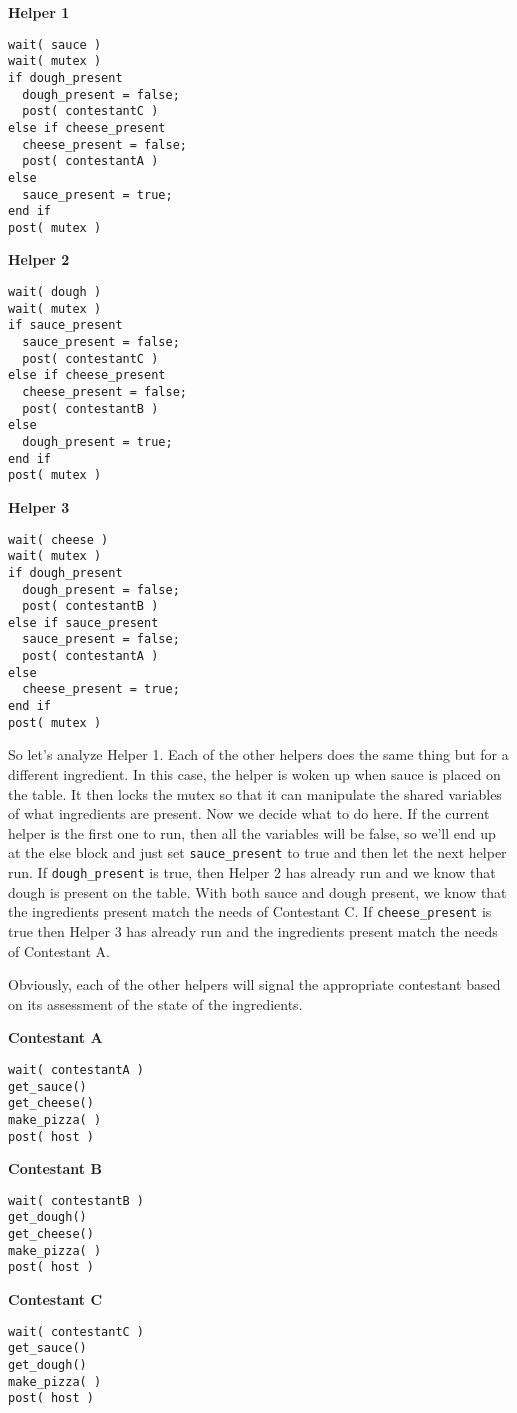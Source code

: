 \begin{multicols}{3}
	\textbf{Helper 1}
	\begin{lstlisting}
wait( sauce )
wait( mutex )
if dough_present  
  dough_present = false;
  post( contestantC )
else if cheese_present
  cheese_present = false;
  post( contestantA )
else
  sauce_present = true;
end if  
post( mutex )
\end{lstlisting}
	\columnbreak
	\textbf{Helper 2}
	\begin{lstlisting}
wait( dough )
wait( mutex )
if sauce_present  
  sauce_present = false;
  post( contestantC )
else if cheese_present
  cheese_present = false;
  post( contestantB )
else
  dough_present = true;
end if  
post( mutex )
\end{lstlisting}
	\columnbreak
	\textbf{Helper 3}
	\begin{lstlisting}
wait( cheese )
wait( mutex )
if dough_present  
  dough_present = false;
  post( contestantB )
else if sauce_present
  sauce_present = false;
  post( contestantA )
else
  cheese_present = true;
end if  
post( mutex )
\end{lstlisting}
\end{multicols}

So let's analyze Helper 1. Each of the other helpers does the same thing but for a different ingredient. In this case, the helper is woken up when sauce is placed on the table. It then locks the mutex so that it can manipulate the shared variables of what ingredients are present. Now we decide what to do here. If the current helper is the first one to run, then all the variables will be false, so we'll end up at the else block and just set \texttt{sauce\_present} to true and then let the next helper run. If \texttt{dough\_present} is true, then Helper 2 has already run and we know that dough is present on the table. With both sauce and dough present, we know that the ingredients present match the needs of Contestant C. If \texttt{cheese\_present} is true then Helper 3 has already run and the ingredients present match the needs of Contestant A.

Obviously, each of the other helpers will signal the appropriate contestant based on its assessment of the state of the ingredients.

\begin{multicols}{3}
	\textbf{Contestant A}
	\begin{lstlisting}
wait( contestantA )
get_sauce()
get_cheese()
make_pizza( )
post( host )
\end{lstlisting}
	\columnbreak
	\textbf{Contestant B}
	\begin{lstlisting}
wait( contestantB )
get_dough()
get_cheese()
make_pizza( )
post( host )
\end{lstlisting}
	\columnbreak
	\textbf{Contestant C}
	\begin{lstlisting}
wait( contestantC )
get_sauce()
get_dough()
make_pizza( )
post( host )
\end{lstlisting}
\end{multicols}

